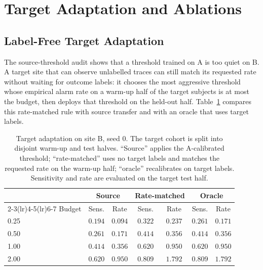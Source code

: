 \section{Target Adaptation and Ablations}
\label{sec:supp-adaptation}

\subsection{Label-Free Target Adaptation}
\label{sec:adaptation}

The source-threshold audit shows that a threshold trained on A is too quiet on B. A target site that can observe unlabelled traces can still match its requested rate without waiting for outcome labels: it chooses the most aggressive threshold whose empirical alarm rate on a warm-up half of the target subjects is at most the budget, then deploys that threshold on the held-out half. Table~\ref{tab:adaptation} compares this rate-matched rule with source transfer and with an oracle that uses target labels.

\begin{table}[H]
\centering
\caption{Target adaptation on site B, seed 0. The target cohort is split into disjoint warm-up and test halves. ``Source'' applies the A-calibrated threshold; ``rate-matched'' uses no target labels and matches the requested rate on the warm-up half; ``oracle'' recalibrates on target labels. Sensitivity and rate are evaluated on the target test half.}
\label{tab:adaptation}
\small
\begin{tabular}{lcccccc}
\toprule
 & \multicolumn{2}{c}{Source} & \multicolumn{2}{c}{Rate-matched} & \multicolumn{2}{c}{Oracle} \\
\cmidrule(lr){2-3}\cmidrule(lr){4-5}\cmidrule(lr){6-7}
Budget & Sens. & Rate & Sens. & Rate & Sens. & Rate \\
\midrule
0.25 & $0.194$ & $0.094$ & $0.322$ & $0.237$ & $0.261$ & $0.171$ \\
0.50 & $0.261$ & $0.171$ & $0.414$ & $0.356$ & $0.414$ & $0.356$ \\
1.00 & $0.414$ & $0.356$ & $0.620$ & $0.950$ & $0.620$ & $0.950$ \\
2.00 & $0.620$ & $0.950$ & $0.809$ & $1.792$ & $0.809$ & $1.792$ \\
\bottomrule
\end{tabular}
\end{table}

